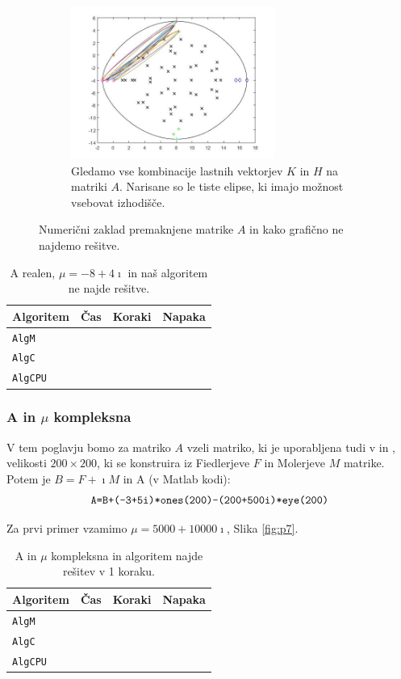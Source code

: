 \documentclass[12pt,a4paper]{amsart}
\theoremstyle{definition}
\theoremstyle{plain}
\begin{document}
\begin{figure}[H]
\begin{subfigure}[t]{0.45\textwidth}
\label{fig:p63}
\end{subfigure}%
\hfill
\begin{subfigure}[t]{0.45\textwidth}
\includegraphics[width=0.9\linewidth,height=5cm]{RC4e3.jpg}
\caption{Gledamo vse kombinacije lastnih vektorjev $K$ in $H$ na matriki $A$\footnotemark[\value{footnote}]. Narisane so le tiste elipse, ki imajo možnost vsebovat izhodišče.}
\label{fig:p63}
\end{subfigure}
\caption{Numerični zaklad premaknjene matrike $A$ in kako grafično ne najdemo rešitve.}
\end{figure}

\begin{table}[H]
\begin{tabular}{|l|l|c|r|}
\hline
Algoritem & Čas & Koraki & Napaka\\
\hline
\hline
\verb+AlgM+ & & & \\
\hline
\verb+AlgC+ & & & \\
\hline
\verb+AlgCPU+ & & & \\
\hline
\end{tabular}
\caption{A realen, $\mu = -8+4\imath$ in naš algoritem ne najde rešitve.}
\label{t6}
\end{table}

\subsubsection{A in $\mu$ kompleksna}
V tem poglavju bomo za matriko $A$ vzeli matriko,  ki je uporabljena tudi v \cite{meurant} in \cite{trije}, velikosti $200\times 200$, ki se konstruira iz Fiedlerjeve $F$ in Molerjeve $M$ matrike. Potem je $B=F + \imath M$ in A (v Matlab kodi):
$$\verb~A=B+(-3+5i)*ones(200)-(200+500i)*eye(200)~$$

Za prvi primer vzamimo $\mu = 5000+10000\imath$, Slika \ref{fig:p7}.


\begin{table}[H]
\begin{tabular}{|l|l|c|r|}
\hline
Algoritem & Čas & Koraki & Napaka\\
\hline
\hline
\verb+AlgM+ & & & \\
\hline
\verb+AlgC+ & & & \\
\hline
\verb+AlgCPU+ & & & \\
\hline
\end{tabular}
\caption{A in $\mu$ kompleksna in algoritem najde rešitev v 1 koraku.}
\label{t7}
\end{table}
\end{document}
